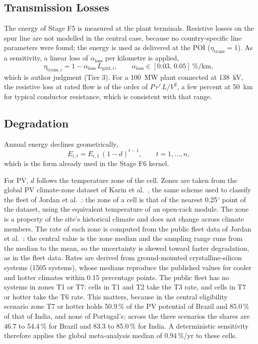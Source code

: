 \subsection{Transmission Losses}
\label{subsec:g3_losses}

The energy of Stage F5 is measured at the plant terminals. Resistive
losses on the spur line are not modelled in the central case, because no
country-specific line parameters were found; the energy is used as
delivered at the POI ($\eta_{\mathrm{trans}}=1$). As a sensitivity, a
linear loss of $\alpha_{\mathrm{loss}}$ per kilometre is applied,
\begin{equation}
    \eta_{\mathrm{trans},i} = 1 - \alpha_{\mathrm{loss}}\,L_{\mathrm{grid},i},
    \qquad \alpha_{\mathrm{loss}} \in [0.03,\,0.05]~\%/\mathrm{km},
    \label{eq:g3_losses}
\end{equation}
which is author judgment (Tier 3). For a 100~MW plant connected at
138~kV, the resistive loss at rated flow is of the order of
$P\,r'\,L/V^2$, a few percent at 50~km for typical conductor resistance,
which is consistent with that range.

\subsection{Degradation}
\label{subsec:g3_degradation}

Annual energy declines geometrically,
\begin{equation}
    E_{i,t} = E_{i,1}\,(1-d)^{t-1}, \qquad t = 1,\dots,n,
    \label{eq:g3_degradation}
\end{equation}
which is the form already used in the Stage F6 kernel.

For PV, $d$ follows the temperature zone of the cell. Zones are taken
from the global PV climate-zone dataset of Karin et al.\ \cite{karin2019,pvcz},
the same scheme used to classify the fleet of Jordan et al.\
\cite{jordan2022}: the zone of a cell is that of the nearest 0.25$^\circ$
point of the dataset, using the equivalent temperature of an open-rack
module. The zone is a property of the site's historical climate and does
not change across climate members. The rate of each zone is computed
from the public fleet data of Jordan et al.\ \cite{jordan2022}: the
central value is the zone median and the sampling range runs from the
median to the mean, so the uncertainty is skewed toward faster
degradation, as in the fleet data. Rates are derived from ground-mounted
crystalline-silicon systems (1505 systems), whose medians reproduce the
published values for cooler and hotter climates within 0.15 percentage
points. The public fleet has no systems in zones T1 or T7: cells in T1
and T2 take the T3 rate, and cells in T7 or hotter take the T6 rate.
This matters, because in the central eligibility scenario zone T7 or
hotter holds 50.9\,\% of the PV potential of Brazil and 85.0\,\% of that
of India, and none of Portugal's; across the three scenarios the shares
are 46.7 to 54.4\,\% for Brazil and 83.3 to 85.0\,\% for India.
A deterministic sensitivity therefore applies the global
meta-analysis median of 0.94\,\%/yr \cite{straubmuck2025} to these
cells.

